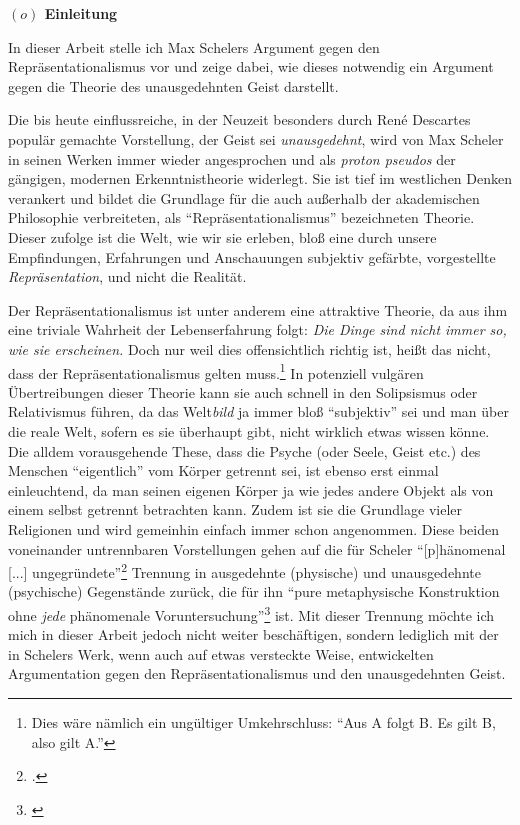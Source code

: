 \documentclass[a4paper, 12pt]{article}
\begin{document}
\begin{onehalfspace} 

\noindent\textbf{$(o)$ Einleitung}

\noindent In dieser Arbeit stelle ich Max Schelers Argument gegen den Repräsen\-tatio\-na\-lismus vor und zeige dabei, wie dieses notwendig ein Argument gegen die Theorie des unausgedehnten Geist darstellt. 

Die bis heute einflussreiche, in der Neuzeit besonders durch Ren\'e Descartes populär gemachte Vorstellung, der Geist sei \emph{unausgedehnt}, wird von Max Scheler in seinen Werken immer wieder angesprochen und als \emph{proton pseudos} der gängigen, modernen Erkenntnistheorie widerlegt. Sie ist tief im westlichen Denken verankert und bildet die Grundlage für die auch außerhalb der akademischen Philosophie verbreiteten, als "`Repräsentationalismus"' bezeichneten Theorie. Dieser zufolge ist die Welt, wie wir sie erleben, bloß eine durch unsere Empfindungen, Erfahrungen und Anschauungen subjektiv gefärbte, vorgestellte \emph{Repräsentation}, und nicht die Realität.

Der Repräsentationalismus ist unter anderem eine attraktive Theorie, da aus ihm eine triviale Wahrheit der Lebenserfahrung folgt: \emph{Die Dinge sind nicht immer so, wie sie erscheinen.} Doch nur weil dies offensichtlich richtig ist, heißt das nicht, dass der Repräsentationalismus gelten muss.\footnote{Dies wäre nämlich ein ungültiger Umkehrschluss: "`Aus A folgt B. Es gilt B, also gilt A."'} In potenziell vulgären Übertreibungen dieser Theorie kann sie auch schnell in den Solipsismus oder Relativismus führen, da das Welt\emph{bild} ja immer bloß "`subjektiv"' sei und man über die reale Welt, sofern es sie überhaupt gibt, nicht wirklich etwas wissen könne. Die alldem vorausgehende These, dass die Psyche (oder Seele, Geist etc.) des Menschen "`eigentlich"' vom Körper getrennt sei, ist ebenso erst einmal einleuchtend, da man seinen eigenen Körper ja wie jedes andere Objekt als von einem selbst getrennt betrachten kann. Zudem ist sie die Grundlage vieler Religionen und wird gemeinhin einfach immer schon angenommen. Diese beiden voneinander untrennbaren Vorstellungen gehen auf die für Scheler "`[p]hänomenal [...] ungegründete"'\footnote{\Cite[Siehe][S. 229]{scheler-idole}.} Trennung in ausgedehnte (physische) und unausgedehnte (psychische) Gegenstände zurück, die für ihn "`pure metaphysische Konstruktion ohne \emph{jede} phänomenale Voruntersuchung"'\footnote{\Cite[Siehe][S. 229]{scheler-idole}} ist. Mit dieser Trennung möchte ich mich in dieser Arbeit jedoch nicht weiter beschäftigen, sondern lediglich mit der in Schelers Werk, wenn auch auf etwas versteckte Weise, entwickelten Argumentation gegen den Repräsentationalismus und den unausgedehnten Geist. 


\end{onehalfspace}
\end{document}

